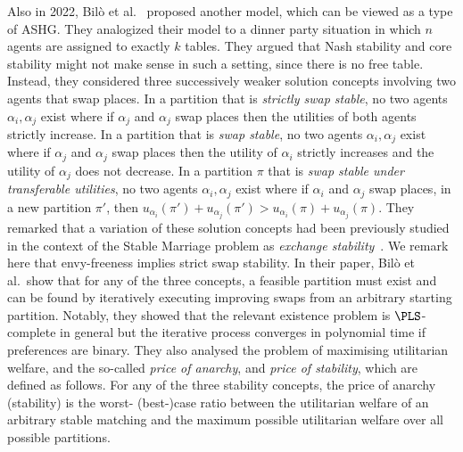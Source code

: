 Also in 2022, Bil\`o et al.~\cite{Bilo22} proposed another model, which can be viewed as a type of ASHG. They analogized their model to a dinner party situation in which $n$ agents are assigned to exactly $k$ tables. They argued that Nash stability and core stability might not make sense in such a setting, since there is no free table. Instead, they considered three successively weaker solution concepts involving two agents that swap places. In a partition that is \emph{strictly swap stable}, no two agents $\alpha_i, \alpha_j$ exist where if $\alpha_j$ and $\alpha_j$ swap places then the utilities of both agents strictly increase. In a partition that is \emph{swap stable}, no two agents $\alpha_i, \alpha_j$ exist where if $\alpha_j$ and $\alpha_j$ swap places then the utility of $\alpha_i$ strictly increases and the utility of $\alpha_j$ does not decrease. In a partition $\pi$ that is \emph{swap stable under transferable utilities}, no two agents $\alpha_i, \alpha_j$ exist where if $\alpha_i$ and $\alpha_j$ swap places, in a new partition $\pi'$, then $u_{\alpha_i}(\pi') + u_{\alpha_j}(\pi') > u_{\alpha_i}(\pi) + u_{\alpha_j}(\pi)$. They remarked that a variation of these solution concepts had been previously studied in the context of the Stable Marriage problem as \emph{exchange stability}~\cite{Alc94}. We remark here that envy-freeness implies strict swap stability. In their paper, Bil\`o et al.\ show that for any of the three concepts, a feasible partition must exist and can be found by iteratively executing improving swaps from an arbitrary starting partition. Notably, they showed that the relevant existence problem is $\PLS$-complete in general but the iterative process converges in polynomial time if preferences are binary. They also analysed the problem of maximising utilitarian welfare, and the so-called \emph{price of anarchy}, and \emph{price of stability}, which are defined as follows. For any of the three stability concepts, the price of anarchy (stability) is the worst- (best-)case ratio between the utilitarian welfare of an arbitrary stable matching and the maximum possible utilitarian welfare over all possible partitions.



